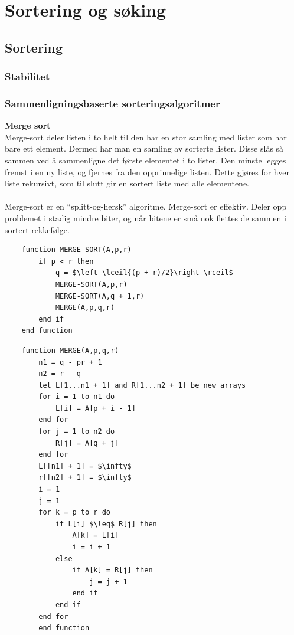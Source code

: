 \section{Sortering og søking}

\subsection{Sortering}

\subsubsection{Stabilitet}

\subsubsection{Sammenligningsbaserte sorteringsalgoritmer}

\noindent \textbf{Merge sort}\\
Merge-sort deler listen i to helt til den har en stor samling med lister som har bare ett element. Dermed har man en samling av sorterte lister. Disse slås så sammen ved å sammenligne det første elementet i to lister. Den minste legges fremst i en ny liste, og fjernes fra den opprinnelige listen. Dette gjøres for hver liste rekursivt, som til slutt gir en sortert liste med alle elementene.
\\\\
Merge-sort er en “splitt-og-hersk” algoritme. Merge-sort er effektiv. Deler opp problemet i stadig mindre biter, og når bitene er små nok flettes de sammen i sortert rekkefølge.

\begin{lstlisting}
    function MERGE-SORT(A,p,r)
    	if p < r then
    		q = $\left \lceil{(p + r)/2}\right \rceil$
    		MERGE-SORT(A,p,r)
    		MERGE-SORT(A,q + 1,r)
    		MERGE(A,p,q,r)
    	end if
    end function
\end{lstlisting}

\begin{lstlisting}
    function MERGE(A,p,q,r)
	    n1 = q - pr + 1
    	n2 = r - q
	    let L[1...n1 + 1] and R[1...n2 + 1] be new arrays
        for i = 1 to n1 do
	        L[i] = A[p + i - 1]
        end for
        for j = 1 to n2 do
        	R[j] = A[q + j]
        end for
        L[[n1] + 1] = $\infty$
        r[[n2] + 1] = $\infty$
        i = 1
        j = 1
        for k = p to r do
        	if L[i] $\leq$ R[j] then
        		A[k] = L[i]
        		i = i + 1
        	else
        		if A[k] = R[j] then
        			j = j + 1
        		end if
        	end if
        end for
        end function
\end{lstlisting}

